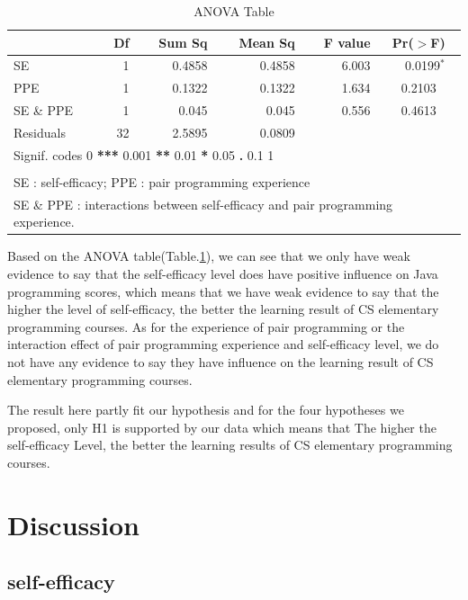 \documentclass{sigchi}
\begin{document}
\begin{table}[ht]
\begin{center}
\caption{ANOVA Table}
\label{table1}
\begin{tabular}{lrrrrc}
  \hline
 & Df & Sum Sq & Mean Sq & F value & Pr($>$F) \\ 
  \hline
SE      &1	&0.4858	&0.4858	 &6.003	  &~~0.0199$^*$  \\
PPE         &1	&0.1322	&0.1322	 &1.634	  &0.2103      \\ 
 SE \& PPE          &1	&0.045	&0.045	&0.556	&0.4613  \\
  Residuals  	&32	&2.5895 & 0.0809 &  &  \\ 
   \hline
   \hline
\multicolumn{6}{l}{Signif. codes    0 \textbf{ *** } 0.001 \textbf{ ** } 0.01\textbf{ * } 0.05 \textbf{ . } 0.1 \textbf{   } 1} \\ 
\hline \\
\multicolumn{6}{l}{\small SE : self-efficacy; PPE :  pair programming experience} \\
\multicolumn{6}{l}{\small SE \& PPE  : interactions between self-efficacy and pair programming experience.}
\end{tabular}
\end{center}
\end{table}

Based on the ANOVA table(Table.\ref{table1}), we can see that we only have weak evidence to say that the self-efficacy level does have positive influence on Java programming scores, which means that we have weak evidence to say that the higher the level of self-efficacy, the better the learning result of CS elementary programming courses. As for the experience of pair programming or the interaction effect of pair programming experience and self-efficacy level, we do not have any evidence to say they have influence on the learning result of CS elementary programming courses.

The result here partly fit our hypothesis and for the four hypotheses we proposed, only H1 is supported by our data which means that The higher the self-efficacy Level, the better the learning results of CS elementary programming courses. 


\section{Discussion}
\subsection{self-efficacy}
\end{document}
